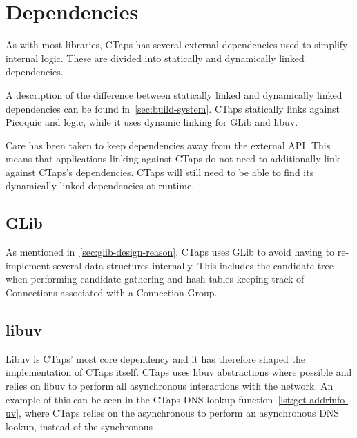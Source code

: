 \section{Dependencies}
As with most libraries, CTaps has several external dependencies
used to simplify internal logic.
These are divided into statically and dynamically linked dependencies.

A description of the difference between statically linked and dynamically linked
dependencies can be found in~\cref{sec:build-system}. CTaps statically links against
Picoquic and log.c, while it uses dynamic linking for GLib and libuv.

Care has been taken to keep dependencies away from the external API.
This means that applications linking against CTaps do not need to additionally
link against CTaps's dependencies. CTaps will still need to be able to find
its dynamically linked dependencies at runtime.

\subsection{GLib}
As mentioned in~\cref{sec:glib-design-reason}, CTaps uses GLib 
to avoid having to re-implement several data structures internally.
This includes the candidate tree when performing candidate gathering
and hash tables keeping track of Connections associated with a Connection Group.

\subsection{libuv}
Libuv is CTaps' most core dependency and it has therefore shaped the implementation
of CTaps itself. CTaps uses libuv abstractions where possible and relies on libuv
to perform all asynchronous interactions with the network. An example of this
can be seen in the CTaps DNS lookup function~\cref{lst:get-addrinfo-uv}, where CTaps relies on the asynchronous
 to perform an asynchronous DNS lookup, instead of the synchronous
.

